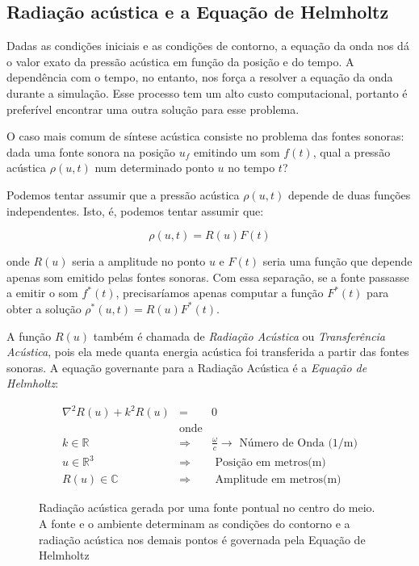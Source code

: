 \subsection{Radiação acústica e a Equação de Helmholtz}

Dadas as condições iniciais e as condições de contorno, a equação da onda nos dá o valor exato da pressão acústica em função da posição e do tempo. A dependência com o tempo, no entanto, nos força a resolver a equação da onda durante a simulação. Esse processo tem um alto custo computacional, portanto é preferível encontrar uma outra solução para esse problema.


O caso mais comum de síntese acústica consiste no problema das fontes sonoras: dada uma fonte sonora na posição $u_f$ emitindo um som $f(t)$, qual a pressão acústica $\rho(u, t)$ num determinado ponto $u$ no tempo $t$?

Podemos tentar assumir que a pressão acústica $\rho(u, t)$ depende de duas funções independentes. Isto, é, podemos tentar assumir que:

\begin{equation}
	\rho(u, t) = R(u)F(t)
\end{equation}

onde $R(u)$ seria a amplitude no ponto $u$ e $F(t)$ seria uma função que depende apenas som emitido pelas fontes sonoras. Com essa separação, se a fonte passasse a emitir o som $f^*(t)$, precisaríamos apenas computar a função $F^*(t)$ para obter a solução $\rho^*(u, t) = R(u)F^*(t)$. 

A função $R(u)$ também é chamada de \emph{Radiação Acústica} ou \emph{Transferência Acústica}, pois ela mede quanta energia acústica foi transferida a partir das fontes sonoras. A equação governante para a Radiação Acústica é a \emph{Equação de Helmholtz}:

\begin{eqnarray}
	\nabla^2 R(u) + k^2R(u) &=& 0\label{helmholtzequation}\\
&\text{onde}&\nonumber\\
k \in \mathbb{R} &\Rightarrow& \frac{\omega}{c}\rightarrow\text{ Número de Onda (1/m)} \nonumber\\
u \in \mathbb{R}^3 &\Rightarrow& \text{ Posição em metros(m)} \nonumber\\
R(u) \in \mathbb{C} &\Rightarrow& \text{ Amplitude em metros(m)} \nonumber
\end{eqnarray}

\begin{figure}[ht]
	\centering
	
	\caption[Radiação acústica gerada uma fonte pontual]{Radiação acústica gerada por uma fonte pontual no centro do meio. A fonte e o ambiente determinam as condições do contorno e a radiação acústica nos demais pontos é governada pela Equação de Helmholtz}\label{helmholtz}
\end{figure}

